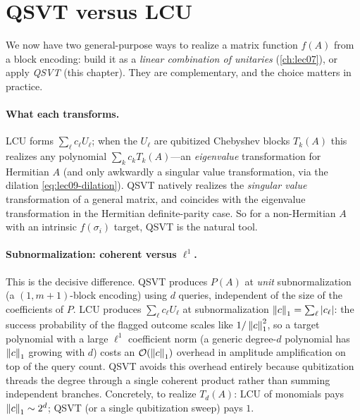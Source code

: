 \section{QSVT versus LCU}
\label{sec:lec09-4}

We now have two general-purpose ways to realize a matrix function $f(A)$ from a block
encoding: build it as a \emph{linear combination of unitaries} (\cref{ch:lec07}), or
apply \emph{QSVT} (this chapter). They are complementary, and the choice matters in
practice.

\paragraph{What each transforms.} LCU forms $\sum_\ell c_\ell U_\ell$; when the $U_\ell$
are qubitized Chebyshev blocks $T_k(A)$ this realizes any polynomial
$\sum_k c_k T_k(A)$---an \emph{eigenvalue} transformation for Hermitian $A$ (and only
awkwardly a singular value transformation, via the dilation
\eqref{eq:lec09-dilation}). QSVT natively realizes the \emph{singular value}
transformation of a general matrix, and coincides with the eigenvalue transformation in
the Hermitian definite-parity case. So for a non-Hermitian $A$ with an intrinsic
$f(\sigma_i)$ target, QSVT is the natural tool.

\paragraph{Subnormalization: coherent versus $\ell^1$.} This is the decisive
difference. QSVT produces $P(A)$ at \emph{unit} subnormalization (a $(1,m+1)$-block
encoding) using $d$ queries, independent of the size of the coefficients of $P$. LCU
produces $\sum_\ell c_\ell U_\ell$ at subnormalization $\left\lVert c \right\rVert_1=\sum_\ell\left\lvert c_\ell \right\rvert$: the success probability of the flagged outcome scales like
$1/\left\lVert c \right\rVert_1^2$, so a target polynomial with a large $\ell^1$ coefficient norm (a
generic degree-$d$ polynomial has $\left\lVert c \right\rVert_1$ growing with $d$) costs an
$\mathcal{O}(\left\lVert c \right\rVert_1)$ overhead in amplitude amplification on top of the query count. QSVT
avoids this overhead entirely because qubitization threads the degree through a single
coherent product rather than summing independent branches. Concretely, to realize
$T_d(A)$: LCU of monomials pays $\left\lVert c \right\rVert_1\sim2^{d}$; QSVT (or a single qubitization
sweep) pays $1$.

